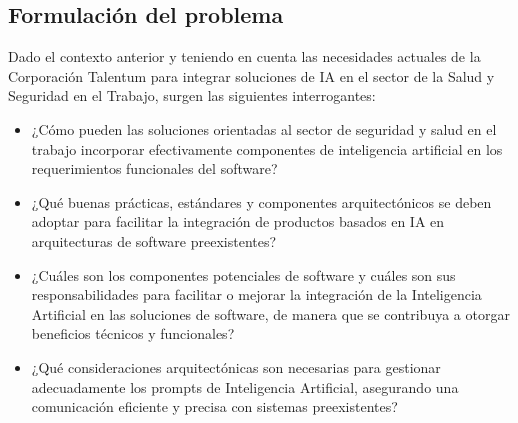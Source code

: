 \subsection{Formulación del problema}

Dado el contexto anterior y teniendo en cuenta las necesidades actuales de la Corporación Talentum para integrar soluciones de IA en el sector de la Salud y Seguridad en el Trabajo, surgen las siguientes interrogantes:
\begin{itemize}
    \item ¿Cómo pueden las soluciones orientadas al sector de seguridad y salud en el trabajo incorporar efectivamente componentes de inteligencia artificial en los requerimientos funcionales del software?
    \item ¿Qué buenas prácticas, estándares y componentes arquitectónicos se deben adoptar para facilitar la integración de productos basados en IA en arquitecturas de software preexistentes?
    \item ¿Cuáles son los componentes potenciales de software y cuáles son sus responsabilidades para facilitar o mejorar la integración de la Inteligencia Artificial en las soluciones de software, de manera que se contribuya a otorgar beneficios técnicos y funcionales?
    \item ¿Qué consideraciones arquitectónicas son necesarias para gestionar adecuadamente los prompts de Inteligencia Artificial, asegurando una comunicación eficiente y precisa con sistemas preexistentes?
\end{itemize}


